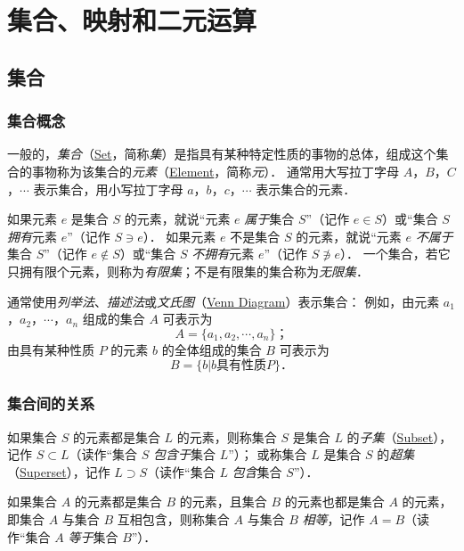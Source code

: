 \chapter{集合、映射和二元运算}

\section{集合}

\subsection{集合概念}

一般的，\emph{集合}（\href{http://mathworld.wolfram.com/Set.html}{Set}，简称\emph{集}）是指具有某种特定性质的事物的总体，组成这个集合的事物称为该集合的\emph{元素}（\href{http://mathworld.wolfram.com/Element.html}{Element}，简称\emph{元}）．
通常用大写拉丁字母 $A$，$B$，$C$，$\cdots$ 表示集合，用小写拉丁字母 $a$，$b$，$c$，$\cdots$ 表示集合的元素．

如果元素 $e$ 是集合 $S$ 的元素，就说``元素 $e$ \emph{属于}集合 $S$''（记作 $e\in{}S$）或``集合 $S$ \emph{拥有}元素 $e$''（记作 $S\ni{}e$）．
如果元素 $e$ 不是集合 $S$ 的元素，就说``元素 $e$ \emph{不属于}集合 $S$''（记作 $e\not\in{}S$）或``集合 $S$ \emph{不拥有}元素 $e$''（记作 $S\not\ni{}e$）．
一个集合，若它只拥有限个元素，则称为\emph{有限集}；不是有限集的集合称为\emph{无限集}．

通常使用\emph{列举法}、\emph{描述法}或\emph{文氏图}（\href{http://mathworld.wolfram.com/VennDiagram.html}{Venn Diagram}）表示集合：
例如，由元素 $a_1$，$a_2$，$\cdots$，$a_n$ 组成的集合 $A$ 可表示为
\[
A = \{ a_1, a_2, \cdots, a_n \} \text{；}
\]
由具有某种性质 $P$ 的元素 $b$ 的全体组成的集合 $B$ 可表示为
\[
B = \{ b | b \text{具有性质} P \} \text{．}
\]

\subsection{集合间的关系}

如果集合 $S$ 的元素都是集合 $L$ 的元素，则称集合 $S$ 是集合 $L$ 的\emph{子集}（\href{http://mathworld.wolfram.com/Subset.html}{Subset}），记作 $S\subset{}L$（读作``集合 $S$ \emph{包含于}集合 $L$''）；
或称集合 $L$ 是集合 $S$ 的\emph{超集}（\href{http://mathworld.wolfram.com/Superset.html}{Superset}），记作 $L\supset{}S$（读作``集合 $L$ \emph{包含}集合 $S$''）．

如果集合 $A$ 的元素都是集合 $B$ 的元素，且集合 $B$ 的元素也都是集合 $A$ 的元素，即集合 $A$ 与集合 $B$ 互相包含，则称集合 $A$ 与集合 $B$ \emph{相等}，记作 $A=B$（读作``集合 $A$ \emph{等于}集合 $B$''）．

